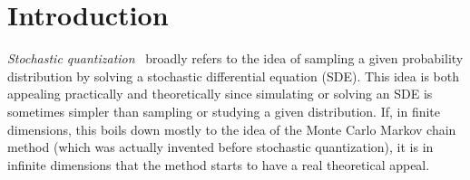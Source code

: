 \documentclass[a4paper,10pt]{article}
\newcommand{\tmtextit}[1]{{\itshape{#1}}}
\begin{document}
{\tableofcontents}

\section{Introduction}\label{section_introduction}

\tmtextit{Stochastic
quantization}~{\cite{damgaard_stochastic_1987,damgaard_stochastic_1988,parisi_perturbation_1981}}
broadly refers to the idea of sampling a given probability distribution by
solving a stochastic differential equation (SDE). This idea is both appealing
practically and theoretically since simulating or solving an SDE is sometimes
simpler than sampling or studying a given distribution. If, in finite
dimensions, this boils down mostly to the idea of the Monte Carlo Markov chain
method (which was actually invented before stochastic quantization), it is in
infinite dimensions that the method starts to have a real theoretical appeal.
\end{document}
